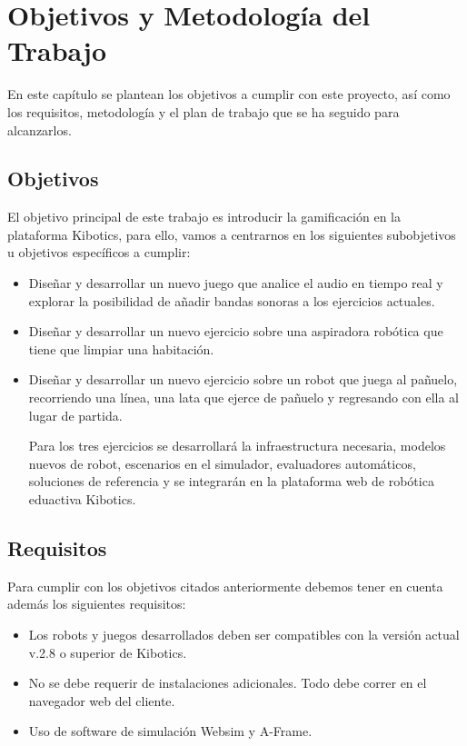 \chapter{Objetivos y Metodología del Trabajo}\label{objetivos}

En este capítulo se plantean los objetivos a cumplir con este proyecto, así como los requisitos, metodología y el plan de trabajo que se ha seguido para alcanzarlos.

\section{Objetivos}

El objetivo principal de este trabajo es introducir la gamificación en la plataforma Kibotics, para ello, vamos a centrarnos en los siguientes subobjetivos u objetivos específicos a cumplir:

\begin{itemize}
    \item Diseñar y desarrollar un nuevo juego que analice el audio en tiempo real y explorar la posibilidad de añadir bandas sonoras a los ejercicios actuales. 

    \item Diseñar y desarrollar un nuevo ejercicio sobre una aspiradora robótica que tiene que limpiar una habitación.

    \item Diseñar y desarrollar un nuevo ejercicio sobre un robot que juega al pañuelo, recorriendo una línea, una lata que ejerce de pañuelo y regresando con ella al lugar de partida.

    Para los tres ejercicios se desarrollará la infraestructura necesaria, modelos nuevos de robot, escenarios en el simulador, evaluadores automáticos, soluciones de referencia y se integrarán en la plataforma web de robótica eduactiva Kibotics.
    
\end{itemize}


\newpage

\section{Requisitos}
Para cumplir con los objetivos citados anteriormente debemos tener en cuenta además los siguientes  requisitos: 
\begin{itemize}
    \item Los robots y juegos desarrollados deben ser compatibles con la versión actual v.2.8 o superior de Kibotics.
    \item No se debe requerir de instalaciones adicionales. Todo debe correr en el navegador web del cliente. 
    \item Uso de software de simulación Websim y A-Frame.
\end{itemize}

